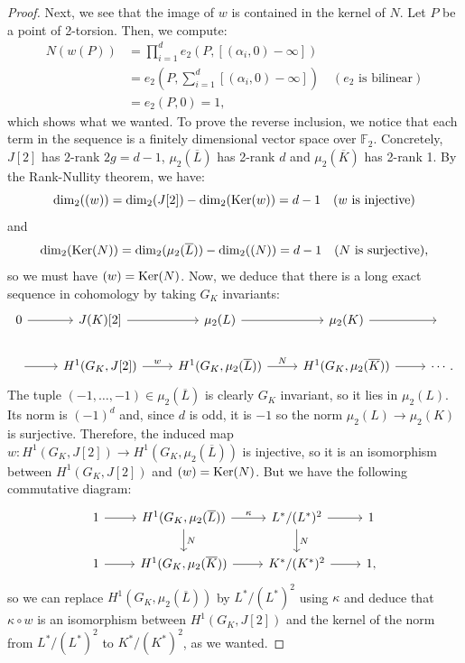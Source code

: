 \documentclass[a4paper, 12pt]{amsart}
\theoremstyle{definition}
\theoremstyle{plain}
\theoremstyle{plain}
\theoremstyle{plain}
\theoremstyle{plain}
\theoremstyle{remark}
\theoremstyle{remark}
\theoremstyle{plain}
\DeclareMathOperator{\Ker}{Ker}
\let\Im\relax
\DeclareMathOperator{\Im}{Im}
\begin{document}
\begin{proof}
		Next, we see that the image of $w$ is contained in the kernel of $N$. Let $P$ be a point of 2-torsion. Then, we compute:
		\begin{align*}
			N(w(P))&=\prod_{i=1}^d e_2(P,[(\alpha_i,0)-\infty])\\
			&=e_2\left(P,\sum_{i=1}^d [(\alpha_i,0)-\infty]\right)    \quad (e_2 \text{ is bilinear})\\
			&=e_2(P,0)=1,
		\end{align*}
		which shows what we wanted. To prove the reverse inclusion, we notice that each term in the sequence is a finitely dimensional vector space over $\mathbb{F}_2$. Concretely, $J[2]$ has $2$-rank $2g=d-1$, $\mu_2(\overline{L})$ has 2-rank $d$ and $\mu_2(\overline{K})$ has 2-rank 1. By the Rank-Nullity theorem, we have:
		\begin{equation*}
			\dim_2(\Im(w))=\dim_2(J[2])-\dim_2(\Ker(w))=d-1 \quad (w\text{ is injective})
		\end{equation*}
		and
		\begin{equation*}		
			\dim_2(\Ker(N))=\dim_2(\mu_2(\overline{L}))-\dim_2(\Im(N))=d-1 \quad (N\text{ is surjective}),
		\end{equation*}
		so we must have $\Im(w)=\Ker(N)$. Now, we deduce that there is a long exact sequence in cohomology by taking $G_K$ invariants:
		\begin{equation*}
			\begin{tikzcd}
				0\arrow{r}
				&J(K)[2]\arrow{r}
				&\mu_2(L)\arrow{r}
				&\mu_2(K)\arrow{r}
				&\phantom{ }
				\\ \arrow{r}
				&H^1(G_K,J[2])\arrow{r}{w}
				&H^1(G_K,\mu_2(\overline{L}))\arrow{r}{N}
				&H^1(G_K,\mu_2(\overline{K}))\arrow{r}
				& \cdots.
			\end{tikzcd}
		\end{equation*}
		The tuple $(-1,\ldots,-1)\in\mu_2(\overline{L})$ is clearly $G_K$ invariant, so it lies in $\mu_2(L)$. Its norm is $(-1)^d$ and, since $d$ is odd, it is $-1$ so the norm $\mu_2(L)\rightarrow\mu_2(K)$ is surjective. Therefore, the induced map $w:H^1(G_K,J[2])\rightarrow H^1(G_K,\mu_2(\overline{L}))$ is injective, so it is an isomorphism between $H^1(G_K,J[2])$ and $\Im(w)=\Ker(N)$. But we have the following commutative diagram:
		\begin{equation*}
		\begin{tikzcd}
			1\arrow{r}
			&H^1(G_K,\mu_2(\overline{L}))\arrow{r}{\kappa}\arrow{d}{N}
			&L^*/(L^*)^2\arrow{r}\arrow{d}{N}
			&1\\
			1\arrow{r}
			&H^1(G_K,\mu_2(\overline{K}))\arrow{r}
			&K^*/(K^*)^2\arrow{r}
			&1,
		\end{tikzcd}
		\end{equation*}
		so we can replace $H^1(G_K,\mu_2(\overline{L}))$ by $L^*/(L^*)^2$ using $\kappa$ and deduce that $\kappa\circ w$ is an isomorphism between $H^1(G_K,J[2])$ and the kernel of the norm from $L^*/(L^*)^2$ to $K^*/(K^*)^2$, as we wanted.
	\end{proof}
	
\end{document}
